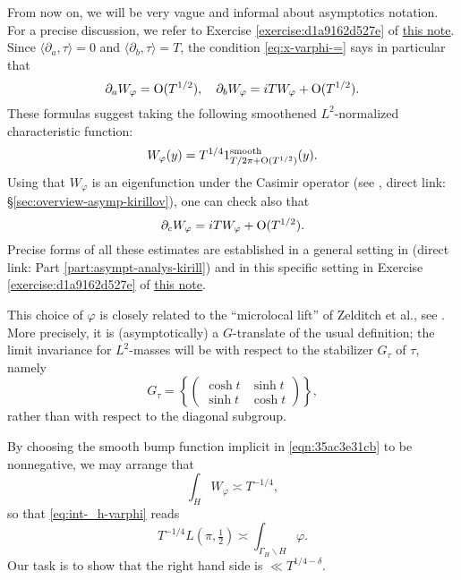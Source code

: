 \documentclass[reqno]{amsart} 
\numberwithin{equation}{section}
\numberwithin{theorem}{section}
\begin{document}
From now on, we will be very vague and informal about asymptotics notation.  For a precise discussion, we refer to Exercise \ref{exercise:d1a9162d527e} of \href{20230524T094424__exercises-localized-vectors.tex.pdf}{this note}.  Since $\langle \partial_a, \tau \rangle = 0$ and $\langle \partial_b, \tau \rangle = T$, the condition \eqref{eq:x-varphi-=} says in particular that
\begin{equation*}
  \partial_a W_\varphi = \operatorname{O}(T^{1/2}),
  \quad
  \partial_b W_\varphi = i T W_\varphi + \operatorname{O}(T^{1/2}).
\end{equation*}
These formulas suggest taking the following smoothened $L^2$-normalized characteristic function:
\begin{equation}\label{eqn:35ac3e31cb}
  W_\varphi(y) = T^{1/4} 1_{T / 2 \pi + \operatorname{O}(T^{1/2})}^{\text{smooth}}(y).
\end{equation}
Using that $W_\varphi$ is an eigenfunction under the Casimir operator (see \cite[\S12]{2021arXiv210915230N}, direct link: \S\ref{sec:overview-asymp-kirillov}), one can check also that
\begin{equation*}
  \partial_c W_\varphi = i T W_\varphi + \operatorname{O}(T^{1/2}).
\end{equation*}
Precise forms of all these estimates are established in a general setting in \cite[Part 3]{2021arXiv210915230N} (direct link: Part \ref{part:asympt-analys-kirill}) and in this specific setting in Exercise \ref{exercise:d1a9162d527e} of \href{20230524T094424__exercises-localized-vectors.tex.pdf}{this note}.
\begin{remark}
  This choice of $\varphi$ is closely related to the ``microlocal lift'' of Zelditch \cite{MR916129} et al., see \cite{MR1859345, MR2346281, MR2314452}.  More precisely, it is (asymptotically) a $G$-translate of the usual definition; the limit invariance for $L^2$-masses will be with respect to the stabilizer $G_\tau$ of $\tau$, namely
\begin{equation}\label{eqn:G-tau}
  G_\tau = \left\{ \begin{pmatrix}
      \cosh t & \sinh t \\
      \sinh t & \cosh t
    \end{pmatrix} \right\},
\end{equation}
rather than with respect to the diagonal subgroup.
\end{remark}

By choosing the smooth bump function implicit in \eqref{eqn:35ac3e31cb} to be nonnegative, we may arrange that
\begin{equation*}
  \int_{H} W_\varphi \asymp  T^{-1/4},
\end{equation*}
so that \eqref{eq:int-_h-varphi} reads
\begin{equation}\label{eqn:35ac3e32a4}
  T^{-1/4} L(\pi,\tfrac{1}{2}) \asymp  \int_{\Gamma_{H} \backslash H} \varphi.
\end{equation}
Our task is to show that the right hand side is $\ll T^{1/4-\delta}$.
\end{document}
